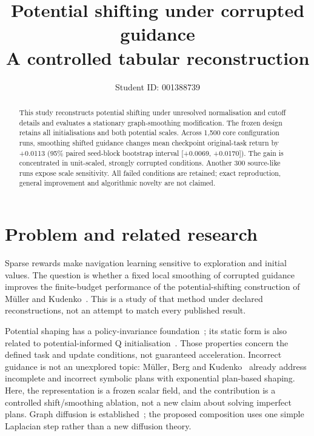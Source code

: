 \documentclass{COMPXXXX}
\begin{document}
\title{Potential shifting under corrupted guidance\\A controlled tabular reconstruction}
\author{Student ID: 001388739}
\maketitle

\begin{abstract}
This study reconstructs potential shifting under unresolved normalisation and cutoff details and evaluates a stationary graph-smoothing modification. The frozen design retains all initialisations and both potential scales. Across 1,500 core configuration runs, smoothing shifted guidance changes mean checkpoint original-task return by +0.0113 (95\% paired seed-block bootstrap interval [+0.0069, +0.0170]). The gain is concentrated in unit-scaled, strongly corrupted conditions. Another 300 source-like runs expose scale sensitivity. All failed conditions are retained; exact reproduction, general improvement and algorithmic novelty are not claimed.
\end{abstract}

\section{Problem and related research}
Sparse rewards make navigation learning sensitive to exploration and initial values. The question is whether a fixed local smoothing of corrupted guidance improves the finite-budget performance of the potential-shifting construction of M{\"u}ller and Kudenko~\cite{mueller2025}. This is a study of that method under declared reconstructions, not an attempt to match every published result.

Potential shaping has a policy-invariance foundation~\cite{ng1999}; its static form is also related to potential-informed Q initialisation~\cite{wiewiora2003}. Those properties concern the defined task and update conditions, not guaranteed acceleration. Incorrect guidance is not an unexplored topic: M{\"u}ller, Berg and Kudenko~\cite{plans2025} already address incomplete and incorrect symbolic plans with exponential plan-based shaping. Here, the representation is a frozen scalar field, and the contribution is a controlled shift/smoothing ablation, not a new claim about solving imperfect plans. Graph diffusion is established~\cite{kondor2002}; the proposed composition uses one simple Laplacian step rather than a new diffusion theory.
\end{document}

